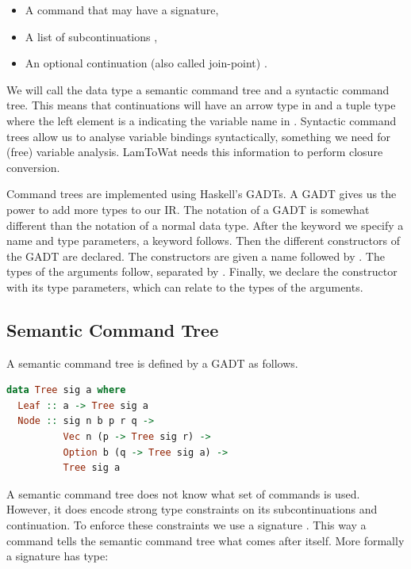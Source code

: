 \begin{itemize}
\item A command  that may have a signature,
\item A list of subcontinuations ,
\item An optional continuation (also called join-point) .
\end{itemize}

We will call the data type  a semantic command tree and  a syntactic command tree. This means that continuations will have an arrow type  in  and a tuple type where the left element is a  indicating the variable name  in . Syntactic command trees allow us to analyse variable bindings syntactically, something we need for (free) variable analysis. LamToWat needs this information to perform closure conversion.

Command trees are implemented using Haskell's GADTs. A GADT gives us the power to add more types to our IR. The notation of a GADT is somewhat different than the notation of a normal data type. After the  keyword we specify a name and type parameters, a  keyword follows. Then the different constructors of the GADT are declared. The constructors are given a name followed by \icode{::}. The types of the arguments follow, separated by \icode{->}. Finally, we declare the constructor with its type parameters, which can relate to the types of the arguments.

\subsection{\label{subsection:semantree}Semantic Command Tree}
A semantic command tree  is defined by a GADT as follows.

\begin{lstlisting}[language=Haskell]
data Tree sig a where
  Leaf :: a -> Tree sig a
  Node :: sig n b p r q ->
          Vec n (p -> Tree sig r) ->
          Option b (q -> Tree sig a) ->
          Tree sig a
\end{lstlisting}

A semantic command tree does not know what set of commands is used. However, it does encode strong type constraints on its subcontinuations and continuation. To enforce these constraints we use a signature . This way a command tells the semantic command tree what comes after itself. More formally a signature has type:

